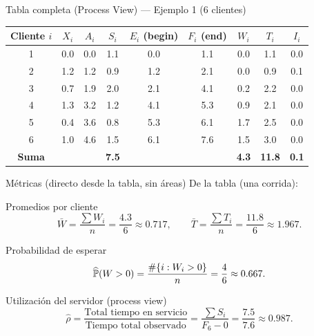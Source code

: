 \documentclass[aspectratio=1610, 9pt]{beamer}
\begin{document}
\begin{frame}{Tabla completa (Process View) — Ejemplo 1 (6 clientes)}

\setlength{\tabcolsep}{3.2pt}
\renewcommand{\arraystretch}{1.18}
\begin{table}
\centering
\begin{tabular}{@{}c c c c c c c c c@{}}
\toprule
Cliente $i$ & $X_i$ & $A_i$ & $S_i$ & $E_i$ (begin) & $F_i$ (end) & $W_i$ & $T_i$ & $I_i$\\
\midrule
1 & 0.0 & 0.0 & 1.1 & 0.0 & 1.1 & 0.0 & 1.1 & 0.0\\
2 & 1.2 & 1.2 & 0.9 & 1.2 & 2.1 & 0.0 & 0.9 & 0.1\\
3 & 0.7 & 1.9 & 2.0 & 2.1 & 4.1 & 0.2 & 2.2 & 0.0\\
4 & 1.3 & 3.2 & 1.2 & 4.1 & 5.3 & 0.9 & 2.1 & 0.0\\
5 & 0.4 & 3.6 & 0.8 & 5.3 & 6.1 & 1.7 & 2.5 & 0.0\\
6 & 1.0 & 4.6 & 1.5 & 6.1 & 7.6 & 1.5 & 3.0 & 0.0\\
\midrule
\textbf{Suma} &  &  & \textbf{7.5} &  &  & \textbf{4.3} & \textbf{11.8} & \textbf{0.1}\\
\bottomrule
\end{tabular}
\end{table}
\end{frame}

\begin{frame}{Métricas (directo desde la tabla, sin áreas)}
\small
De la tabla (una corrida):

\begin{block}{Promedios por cliente}
\[
\bar W=\frac{\sum W_i}{n}=\frac{4.3}{6}\approx 0.717,
\qquad
\bar T=\frac{\sum T_i}{n}=\frac{11.8}{6}\approx 1.967.
\]
\end{block}

\vspace{4pt}
\begin{block}{Probabilidad de esperar}
\[
\widehat{\mathbb{P}}(W>0)=\frac{\#\{i:W_i>0\}}{n}=\frac{4}{6}\approx 0.667.
\]
\end{block}

\vspace{4pt}
\begin{block}{Utilización del servidor (process view)}
\[
\hat\rho=\frac{\text{Total tiempo en servicio}}{\text{Tiempo total observado}}
=\frac{\sum S_i}{F_6-0}=\frac{7.5}{7.6}\approx 0.987.
\]
\end{block}
\end{frame}
\end{document}

